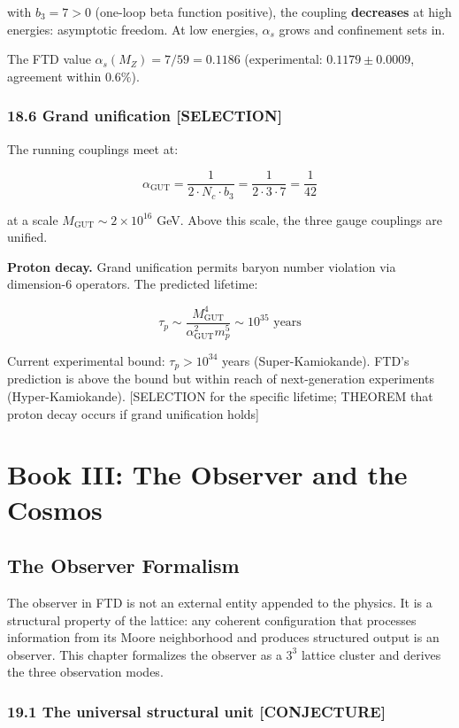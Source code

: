 \documentclass[
  11pt,
  letterpaper,
  twoside,
  openright]{book}
\begin{document}
with \(b_3 = 7 > 0\) (one-loop beta function positive), the coupling
\textbf{decreases} at high energies: asymptotic freedom. At low
energies, \(\alpha_s\) grows and confinement sets in.

The FTD value \(\alpha_s(M_Z) = 7/59 = 0.1186\) (experimental:
\(0.1179 \pm 0.0009\), agreement within \(0.6\%\)).

\section{18.6 Grand unification
{[}SELECTION{]}}\label{grand-unification-selection}

The running couplings meet at:

\[
\alpha_{\text{GUT}} = \frac{1}{2 \cdot N_c \cdot b_3} = \frac{1}{2 \cdot 3 \cdot 7} = \frac{1}{42}
\tag{18.5}
\]

at a scale \(M_{\text{GUT}} \sim 2 \times 10^{16}\) GeV. Above this
scale, the three gauge couplings are unified.

\textbf{Proton decay.} Grand unification permits baryon number violation
via dimension-6 operators. The predicted lifetime:

\[
\tau_p \sim \frac{M_{\text{GUT}}^4}{\alpha_{\text{GUT}}^2 m_p^5} \sim 10^{35} \text{ years}
\tag{18.6}
\]

Current experimental bound: \(\tau_p > 10^{34}\) years
(Super-Kamiokande). FTD's prediction is above the bound but within reach
of next-generation experiments (Hyper-Kamiokande). {[}SELECTION for the
specific lifetime; THEOREM that proton decay occurs if grand unification
holds{]}

\part{Book III: The Observer and the Cosmos}

\chapter{The Observer Formalism}\label{sec-observer}

The observer in FTD is not an external entity appended to the physics.
It is a structural property of the lattice: any coherent configuration
that processes information from its Moore neighborhood and produces
structured output is an observer. This chapter formalizes the observer
as a \(3^3\) lattice cluster and derives the three observation modes.

\section{19.1 The universal structural unit
{[}CONJECTURE{]}}\label{the-universal-structural-unit-conjecture}
\end{document}
